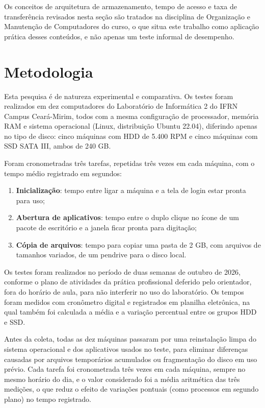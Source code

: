\documentclass[article,12pt,a4paper,oneside]{abntex2}
\begin{document}
Os conceitos de arquitetura de armazenamento, tempo de acesso e taxa de
transferência revisados nesta seção são tratados na disciplina de
Organização e Manutenção de Computadores do curso, o que situa este trabalho
como aplicação prática desses conteúdos, e não apenas um teste informal de
desempenho.

\section{Metodologia}

Esta pesquisa é de natureza experimental e comparativa. Os testes foram
realizados em dez computadores do Laboratório de Informática 2 do IFRN
Campus Ceará-Mirim, todos com a mesma configuração de processador, memória
RAM e sistema operacional (Linux, distribuição Ubuntu 22.04), diferindo
apenas no tipo de disco: cinco máquinas com HDD de 5.400 RPM e cinco
máquinas com SSD SATA III, ambos de 240 GB.

Foram cronometradas três tarefas, repetidas três vezes em cada máquina, com
o tempo médio registrado em segundos:

\begin{enumerate}
  \item \textbf{Inicialização}: tempo entre ligar a máquina e a tela de
        login estar pronta para uso;
  \item \textbf{Abertura de aplicativos}: tempo entre o duplo clique no
        ícone de um pacote de escritório e a janela ficar pronta para
        digitação;
  \item \textbf{Cópia de arquivos}: tempo para copiar uma pasta de 2 GB,
        com arquivos de tamanhos variados, de um pendrive para o disco
        local.
\end{enumerate}

Os testes foram realizados no período de duas semanas de outubro de 2026,
conforme o plano de atividades da prática profissional deferido pelo
orientador, fora do horário de aula, para não interferir no uso do
laboratório. Os tempos foram medidos com cronômetro digital e registrados em
planilha eletrônica, na qual também foi calculada a média e a variação
percentual entre os grupos HDD e SSD.

Antes da coleta, todas as dez máquinas passaram por uma reinstalação limpa
do sistema operacional e dos aplicativos usados no teste, para eliminar
diferenças causadas por arquivos temporários acumulados ou fragmentação do
disco em uso prévio. Cada tarefa foi cronometrada três vezes em cada
máquina, sempre no mesmo horário do dia, e o valor considerado foi a média
aritmética das três medições, o que reduz o efeito de variações pontuais
(como processos em segundo plano) no tempo registrado.
\end{document}
